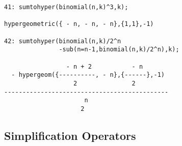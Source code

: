 {\small
\begin{verbatim}
41: sumtohyper(binomial(n,k)^3,k);

hypergeometric({ - n, - n, - n},{1,1},-1)

42: sumtohyper(binomial(n,k)/2^n
               -sub(n=n-1,binomial(n,k)/2^n),k);

                 - n + 2           - n
  - hypergeom({----------, - n},{------},-1)
                   2               2
---------------------------------------------
                      n
                     2
\end{verbatim}
}\noindent


\subsection{Simplification Operators}
\hypertarget{operator:SIMPLIFY_GAMMA}{}                                                                                                                         
\hypertarget{operator:SIMPLIFY_GAMMA2}{}
\hypertarget{operator:SIMPLIFY_GAMMAN}{}
\hypertarget{operator:SIMPLIFY_COMBINATORIAL}{}

